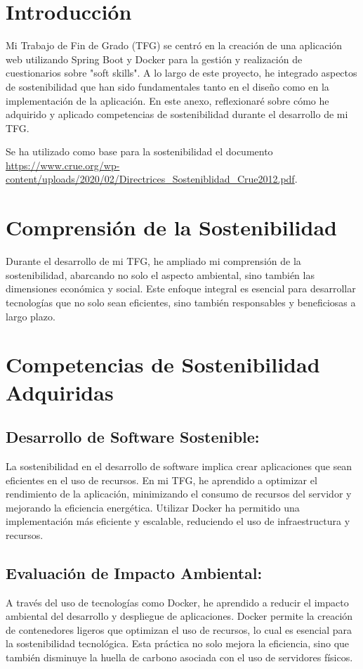 
\section{Introducción}
Mi Trabajo de Fin de Grado (TFG) se centró en la creación de una aplicación web utilizando Spring Boot y Docker para la gestión y realización de cuestionarios sobre "soft skills". A lo largo de este proyecto, he integrado aspectos de sostenibilidad que han sido fundamentales tanto en el diseño como en la implementación de la aplicación. En este anexo, reflexionaré sobre cómo he adquirido y aplicado competencias de sostenibilidad durante el desarrollo de mi TFG.

Se ha utilizado como base para la sostenibilidad el documento \url{https://www.crue.org/wp-content/uploads/2020/02/Directrices_Sosteniblidad_Crue2012.pdf}.

\section{Comprensión de la Sostenibilidad}
Durante el desarrollo de mi TFG, he ampliado mi comprensión de la sostenibilidad, abarcando no solo el aspecto ambiental, sino también las dimensiones económica y social. Este enfoque integral es esencial para desarrollar tecnologías que no solo sean eficientes, sino también responsables y beneficiosas a largo plazo.

\section{Competencias de Sostenibilidad Adquiridas}
\subsection{Desarrollo de Software Sostenible:}

La sostenibilidad en el desarrollo de software implica crear aplicaciones que sean eficientes en el uso de recursos. En mi TFG, he aprendido a optimizar el rendimiento de la aplicación, minimizando el consumo de recursos del servidor y mejorando la eficiencia energética. Utilizar Docker ha permitido una implementación más eficiente y escalable, reduciendo el uso de infraestructura y recursos.

\subsection{Evaluación de Impacto Ambiental:}
A través del uso de tecnologías como Docker, he aprendido a reducir el impacto ambiental del desarrollo y despliegue de aplicaciones. Docker permite la creación de contenedores ligeros que optimizan el uso de recursos, lo cual es esencial para la sostenibilidad tecnológica. Esta práctica no solo mejora la eficiencia, sino que también disminuye la huella de carbono asociada con el uso de servidores físicos.

